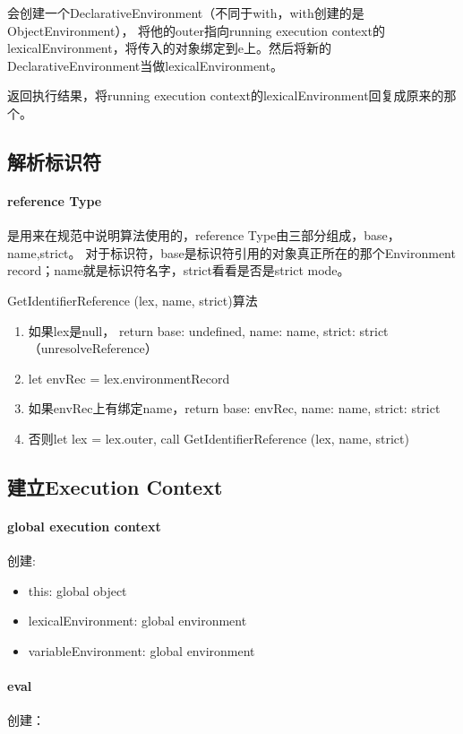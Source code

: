会创建一个DeclarativeEnvironment（不同于with，with创建的是ObjectEnvironment）， 将他的outer指向running execution context的lexicalEnvironment，将传入的对象绑定到e上。然后将新的DeclarativeEnvironment当做lexicalEnvironment。

返回执行结果，将running execution context的lexicalEnvironment回复成原来的那个。
\subsection{解析标识符}
\paragraph{reference Type} 是用来在规范中说明算法使用的，reference Type由三部分组成，base，name,strict。
对于标识符，base是标识符引用的对象真正所在的那个Environment record；name就是标识符名字，strict看看是否是strict mode。

GetIdentifierReference (lex, name, strict)算法
\begin{enumerate}
\item 如果lex是null， return {base: undefined, name: name, strict: strict}（unresolveReference）
\item let envRec = lex.environmentRecord
\item 如果envRec上有绑定name，return {base: envRec, name: name, strict: strict}
\item 否则let lex = lex.outer, call GetIdentifierReference (lex, name, strict)
\end{enumerate}


\subsection{建立Execution Context}
\paragraph{global execution context}
创建:
\begin{itemize}
\item this: global object
\item lexicalEnvironment: global environment
\item variableEnvironment: global environment
\end{itemize}
\paragraph{eval}
创建：


